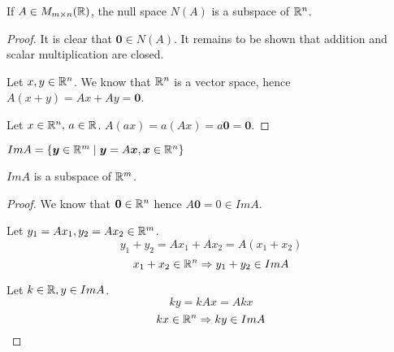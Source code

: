\documentclass[a4paper,10pt]{article}
\begin{document}
\begin{prop}
	If $A \in M_{m \times n}(\mathbb{R})$, the null space $N(A)$ is a
	subspace of $\mathbb{R}^n$.
\end{prop}

\begin{proof}
	It is clear that $\bm{0} \in N(A)$. It remains to be shown
	that addition and scalar multiplication are closed.

	Let $x,y \in \mathbb{R}^n$. We know that $\mathbb{R}^n$ is a vector space,
	hence $A(x+y) = Ax + Ay = \bm{0}$.

	Let $x \in \mathbb{R}^n, \, a \in \mathbb{R}$. $A(ax) = a(Ax) = a\bm{0} = \bm{0}$.
\end{proof}

\begin{defn}
	$Im A = \{ \bm{y} \in \mathbb{R}^m \mid \bm{y} = A\bm{x}, \bm{x} \in \mathbb{R}^n \}$
\end{defn}

\begin{prop}
	$Im A$ is a subspace of $\mathbb{R}^m$.
\end{prop}

\begin{proof}
	We know that $\bm{0} \in \mathbb{R}^n$ hence $A\bm{0} = 0 \in Im A$.

	Let $y_1 = Ax_1, y_2 = Ax_2 \in \mathbb{R}^m$.
	\[
		y_1 + y_2 = Ax_1 + Ax_2 = A(x_1 + x_2)
	\]
	\[
		x_1 + x_2 \in \mathbb{R}^n \Rightarrow y_1 + y_2 \in Im A
	\]

	Let $k \in \mathbb{R}, y \in Im A$.
	\[
		ky = kAx = Akx
	\]
	\[
		kx \in \mathbb{R}^n \Rightarrow ky \in Im A
	\]
\end{proof}
\end{document}
